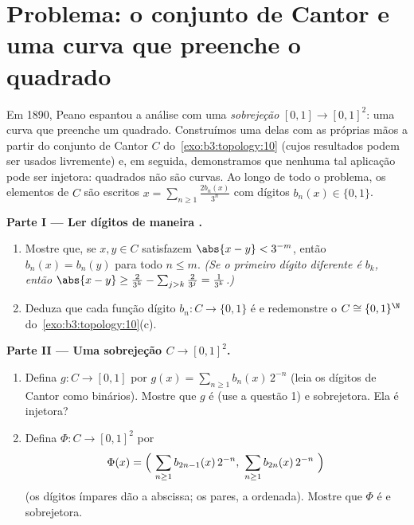\section{Problema: o conjunto de Cantor e uma curva que preenche o
quadrado}

\begin{problem}\label{pb:b3:topology:1}
Em 1890, Peano espantou a análise com uma \emph{sobrejeção }
$[0,1] \to [0,1]^2$: uma curva que preenche um quadrado. Construímos uma delas com as
próprias mãos a partir do conjunto de Cantor $C$ do~\cref{exo:b3:topology:10} (cujos resultados podem ser usados livremente) e, em
seguida, demonstramos que nenhuma tal aplicação pode ser injetora:
quadrados não são curvas. Ao longo de todo o problema, os elementos de
$C$ são escritos $x =
\sum_{n \geq 1} \frac{2b_n(x)}{3^n}$ com dígitos $b_n(x) \in
\{0, 1\}$.

\medskip
\noindent\textbf{Parte I --- Ler dígitos de maneira .}
\begin{enumerate}
  \item Mostre que, se $x, y \in C$ satisfazem $\abs{x - y} <
        3^{-m}$, então $b_n(x) = b_n(y)$ para todo
        $n \leq m$. \emph{(Se o primeiro dígito diferente é $b_k$, então
        $\abs{x - y} \geq \frac{2}{3^k} - \sum_{j>k}\frac2{3^j}
        = \frac1{3^k}$.)}
  \item Deduza que cada função dígito $b_n \colon C \to \{0,
        1\}$ é  e redemonstre o
         $C
        \cong \{0,1\}^\N$ do~\cref{exo:b3:topology:10}(c).
\end{enumerate}

\medskip
\noindent\textbf{Parte II --- Uma sobrejeção  $C \to
[0,1]^2$.}
\begin{enumerate}[resume]
  \item Defina $g \colon C \to [0,1]$ por $g(x) = \sum_{n\geq1}
        b_n(x)\,2^{-n}$ (leia os dígitos de Cantor como
        binários). Mostre que $g$ é  (use a questão 1) e
        sobrejetora. Ela é injetora?
  \item Defina $\Phi \colon C \to [0,1]^2$ por
        \[
        \Phi(x) = \Bigl(\ \sum_{n\geq1} b_{2n-1}(x)\,2^{-n},\
        \sum_{n\geq1} b_{2n}(x)\,2^{-n}\ \Bigr)
        \]
        (os dígitos ímpares dão a abscissa; os pares, a ordenada).
        Mostre que $\Phi$ é  e sobrejetora.
\end{enumerate}


\end{problem}

